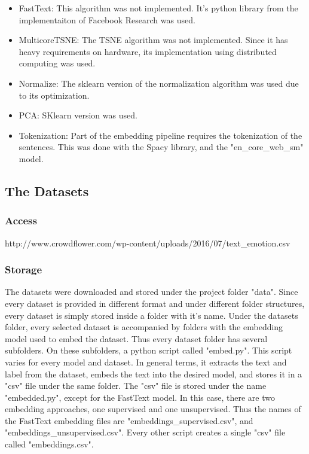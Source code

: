 \begin{itemize}
  \item FastText: This algorithm was not implemented. It's python library from the implementaiton of Facebook Research was used. \cite{TODO}
  \item MulticoreTSNE: The TSNE algorithm was not implemented. Since it has heavy requirements on hardware, its implementation using distributed computing was used. \cite{TODO}
  \item Normalize: The sklearn version of the normalization algorithm was used due to its optimization. \cite{TODO}
  \item PCA: SKlearn version was used. \cite{TODO}
  \item Tokenization: Part of the embedding pipeline requires the tokenization of the sentences. This was done with the Spacy library, and the "en_core_web_sm" model.\cite{TODO}
\end{itemize}


\subsection{The Datasets}\label{sub:The Datasets}

\subsubsection{Access}\label{subs:Access}
http://www.crowdflower.com/wp-content/uploads/2016/07/text_emotion.csv


\subsubsection{Storage}\label{subs:Storage}
The datasets were downloaded and stored under the project folder "data". Since every dataset is provided in different format and under different folder structures, every dataset is simply stored inside a folder with it's name.
Under the datasets folder, every selected dataset is accompanied by folders with the embedding model used to embed the dataset. Thus every dataset folder has several subfolders. On these subfolders, a python script called "embed.py". This script varies for every model and dataset. In general terms, it extracts the text and label from the dataset, embeds the text into the desired model, and stores it in a "csv" file under the same folder.
The "csv" file is stored under the name "embedded.py", except for the FastText model. In this case, there are two embedding approaches, one supervised and one unsupervised. Thus the names of the FastText embedding files are "embeddings_supervised.csv", and "embeddings_unsupervised.csv". Every other script creates a single "csv" file called "embeddings.csv".

